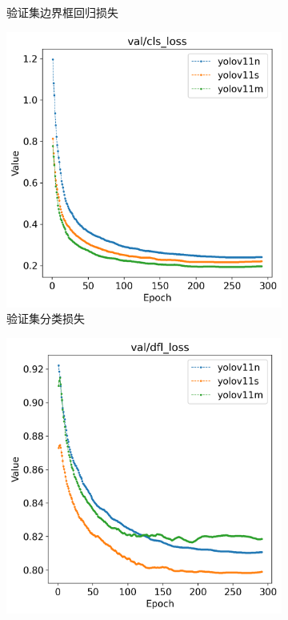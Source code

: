 \begin{figure}[H]
\begin{subfigure}[t]{0.43\textwidth}
        \caption{验证集边界框回归损失}
        \label{fig:helmet_val_box_loss}
    \end{subfigure}
    \begin{subfigure}[t]{0.43\textwidth}
        \centering
        \includegraphics[width=\textwidth]{figs/chap04/helmet_result/helmet_val_cls_loss.png}
        \caption{验证集分类损失}
        \label{fig:helmet_val_cls_loss}
    \end{subfigure}
    \begin{subfigure}[t]{0.43\textwidth}
        \centering
        \includegraphics[width=\textwidth]{figs/chap04/helmet_result/helmet_val_dfl_loss.png}

\end{subfigure}
\end{figure}
